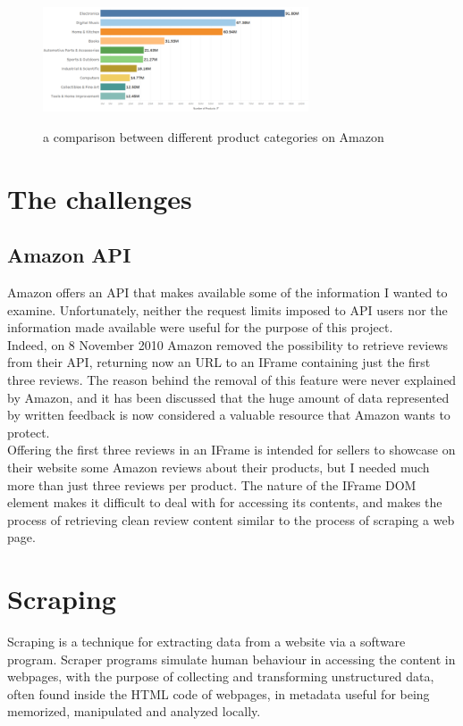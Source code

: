 \documentclass[LaM,oneside,binding=0.6cm]{sapthesis}
\begin{document}
\begin{figure}
\centering
\includegraphics[width=0.7\textwidth]{pictures/prod_types.png}\\[3ex]
\caption{a comparison between different product categories on Amazon}
\label{fig:prod-types}
\end{figure}

\section{The challenges}

\subsection{Amazon API}
Amazon offers an API that makes available some of the information I wanted to examine. Unfortunately, neither the request limits imposed to API users nor the information made available were useful for the purpose of this project. \\
Indeed, on 8 November 2010 Amazon removed the possibility to retrieve reviews from their API, returning now an URL to an IFrame containing just the first three reviews. The reason behind the removal of this feature were never explained by Amazon, and it has been discussed that the huge amount of data represented by written feedback is now considered a valuable resource that Amazon wants to protect. \\
Offering the first three reviews in an IFrame is intended for sellers to showcase on their website some Amazon reviews about their products, but I needed much more than just three reviews per product. The nature of the IFrame DOM element makes it difficult to deal with for accessing its contents, and makes the process of retrieving clean review content similar to the process of scraping a web page. \\


\section{Scraping}

Scraping is a technique for extracting data from a website via a software program. Scraper programs simulate human behaviour in accessing the content in webpages, with the purpose of collecting and transforming unstructured data, often found inside the HTML code of webpages, in metadata useful for being memorized, manipulated and analyzed locally.
\end{document}
